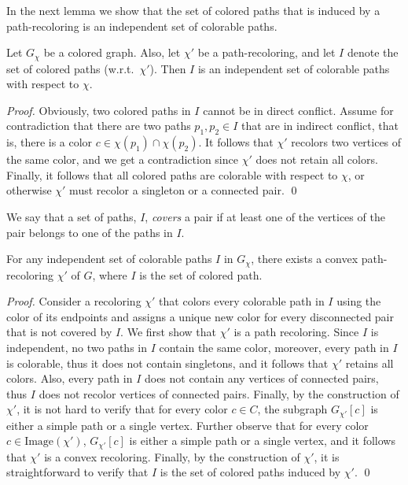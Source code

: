 In the next lemma we show that the set of colored paths that is
induced by a path-recoloring is an independent set of colorable paths.

\begin{lemma}
\label{lm:independent}
Let $G_\chi$ be a colored graph.
%
Also, 
let $\chi'$ be a path-recoloring,
and let $I$ denote the set of colored paths (w.r.t.\ $\chi'$).  
%
Then $I$ is an independent set of colorable paths with respect to $\chi$.
\end{lemma}

\begin{proof}
Obviously, 
two colored paths in $I$ cannot be in direct conflict.
%
Assume for contradiction that there are two paths $p_1, p_2 \in I$
that are in indirect conflict, 
that is, 
there is a color $c \in \chi(p_1) \cap \chi(p_2)$.
%
It follows that $\chi'$ recolors two vertices of the same color, 
and we get a contradiction since $\chi'$ does not retain all colors.
%
Finally, 
it follows that all colored paths are colorable with respect to $\chi$, 
or otherwise $\chi'$ must recolor a singleton or a connected pair.
\qed{}\end{proof}

We say that a set of paths, $I$, \emph{covers} a pair if at least one of the
vertices of the pair belongs to one of the paths in $I$.

\begin{lemma}
\label{lm:independent_set_is_recoloring}
For any independent set of colorable paths $I$ in $G_{\chi}$, 
there exists a convex path-recoloring $\chi'$ of $G$, 
where $I$ is the set of colored path.
\end{lemma}

\begin{proof}
Consider a recoloring $\chi'$ that colors every colorable path in $I$
using the color of its endpoints and assigns a unique new color for
every disconnected pair that is not covered by $I$.
%
We first show that $\chi'$ is a path recoloring.  
%
Since $I$ is independent, 
no two paths in $I$ contain the same color, moreover,
every path in $I$ is colorable, 
thus it does not contain singletons, 
and it follows that $\chi'$ retains all colors.  
%
Also, every path in $I$ does not contain any vertices of connected pairs, 
thus $I$ does not recolor vertices of connected pairs.
%
Finally, by the construction of $\chi'$, 
it is not hard to verify that for every color $c \in C$,
the subgraph $G_{\chi'}[c]$ is either a simple path or a single vertex.
%
Further observe that for every color $c \in \text{Image}(\chi')$,
$G_{\chi'}[c]$ is either a simple path or a single vertex, and it
follows that $\chi'$ is a convex recoloring.  
%
Finally, by the
construction of $\chi'$, it is straightforward to verify that $I$ is
the set of colored paths induced by $\chi'$.
\qed{}\end{proof}

